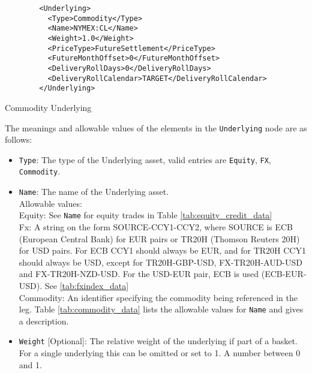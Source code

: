 \begin{listing}[H]
\begin{verbatim}
        <Underlying>
          <Type>Commodity</Type>
          <Name>NYMEX:CL</Name>
          <Weight>1.0</Weight>
          <PriceType>FutureSettlement</PriceType>
          <FutureMonthOffset>0</FutureMonthOffset>
          <DeliveryRollDays>0</DeliveryRollDays>
          <DeliveryRollCalendar>TARGET</DeliveryRollCalendar>
        </Underlying>
\end{verbatim}
\caption{Commodity Underlying}
\label{lst:communderlying}
\end{listing}


The meanings and allowable values of the elements in the \lstinline!Underlying! node are as follows:

\begin{itemize}

\item \lstinline!Type!:
The type of the Underlying asset, valid entries are \lstinline!Equity!, \lstinline!FX!, \lstinline!Commodity!.

\item \lstinline!Name!:
  The name of the Underlying asset. \\
  Allowable values:  \\

  Equity: See \lstinline!Name! for equity trades in Table \ref{tab:equity_credit_data} \\

  Fx: A string on the form SOURCE-CCY1-CCY2, where SOURCE is ECB (European Central Bank) for EUR pairs or TR20H (Thomson
  Reuters 20H) for USD pairs. For ECB CCY1 should always be EUR, and for TR20H CCY1 should always be USD, except for
  TR20H-GBP-USD, FX-TR20H-AUD-USD and FX-TR20H-NZD-USD. For the USD-EUR pair, ECB is used (ECB-EUR-USD). See
  \ref{tab:fxindex_data} \\

  Commodity: An identifier specifying the commodity being referenced in the leg.
Table \ref{tab:commodity_data} lists the allowable values for \lstinline!Name! and gives a description. \\
\item \lstinline!Weight! [Optional]:
The relative weight of the underlying if part of a basket. For a single underlying this can be omitted or set to 1. A number between 0 and 1.


\end{itemize}
